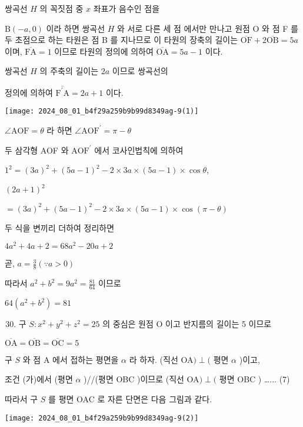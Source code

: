 \documentclass[10pt]{article}
\begin{document}
쌍곡선 $H$ 의 꼭짓점 중 $x$ 좌표가 음수인 점을

$\mathrm{B}(-a, 0)$ 이라 하면 쌍곡선 $H$ 와 서로 다른 세 점 에서만 만나고 원점 O 와 점 F 를 두 초점으로 하는 타원은 점 B 를 지나므로 이 타원의 장축의 길이는 $\overline{\mathrm{OF}}+2 \overline{\mathrm{OB}}=5 a$ 이며, $\overline{\mathrm{FA}}=1$ 이므로 타원의 정의에 의하여 $\overline{\mathrm{OA}}=5 a-1$ 이다.

쌍곡선 $H$ 의 주축의 길이는 $2 a$ 이므로 쌍곡선의

정의에 의하여 $\overline{\mathrm{F}^{\prime} \mathrm{A}}=2 a+1$ 이다.

\begin{center}
\texttt{[image: 2024\_08\_01\_b4f29a259b9b99d8349ag-9(1)]}
\end{center}

$\angle \mathrm{AOF}=\theta$ 라 하면 $\angle \mathrm{AOF}^{\prime}=\pi-\theta$

두 삼각형 AOF 와 $\mathrm{AOF}^{\prime}$ 에서 코사인법칙에 의하여

$1^{2}=(3 a)^{2}+(5 a-1)^{2}-2 \times 3 a \times(5 a-1) \times \cos \theta$,

$(2 a+1)^{2}$

$=(3 a)^{2}+(5 a-1)^{2}-2 \times 3 a \times(5 a-1) \times \cos (\pi-\theta)$

두 식을 변끼리 더하여 정리하면

$4 a^{2}+4 a+2=68 a^{2}-20 a+2$

곧, $a=\frac{3}{8}(\because a>0)$

따라서 $a^{2}+b^{2}=9 a^{2}=\frac{81}{64}$ 이므로

$64\left(a^{2}+b^{2}\right)=81$

\begin{enumerate}
  \setcounter{enumi}{29}
  \item 구 $S: x^{2}+y^{2}+z^{2}=25$ 의 중심은 원점 O 이고 반지름의 길이는 5 이므로
\end{enumerate}

$\overline{\mathrm{OA}}=\overline{\mathrm{OB}}=\overline{\mathrm{OC}}=5$

구 $S$ 와 점 A 에서 접하는 평면을 $\alpha$ 라 하자. (직선 OA$) \perp($ 평면 $\alpha$ )이고,

조건 (가)에서 (평면 $\alpha$ )//(평면 OBC )이므로 (직선 OA$) \perp($ 평면 OBC ) …... (7)

따라서 구 $S$ 를 평면 OAC 로 자른 단면은 다음 그림과 같다.

\begin{center}
\texttt{[image: 2024\_08\_01\_b4f29a259b9b99d8349ag-9(2)]}
\end{center}
\end{document}
